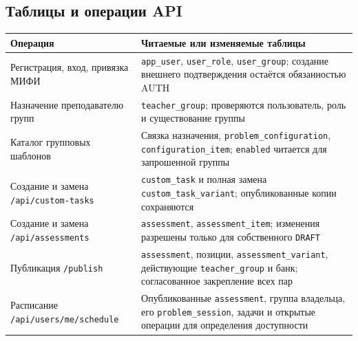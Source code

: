 \documentclass[12pt,a4paper]{article}
\newcounter{none} %
\begin{document}
\subsection{Таблицы и операции API}\label{ux442ux430ux431ux43bux438ux446ux44b-ux438-ux43eux43fux435ux440ux430ux446ux438ux438-api}

\hypertarget{таблицы-и-операции-api}{}

{\def\LTcaptype{none} %
\begin{longtable}[]{@{}
  >{\raggedright\arraybackslash}p{}
  >{\raggedright\arraybackslash}p{}@{}}
\toprule\noalign{}
\begin{minipage}[b]{\linewidth}\raggedright
Операция
\end{minipage} & \begin{minipage}[b]{\linewidth}\raggedright
Читаемые или изменяемые таблицы
\end{minipage} \\
\midrule\noalign{}
\endhead
\bottomrule\noalign{}
\endlastfoot
Регистрация, вход, привязка МИФИ & \texttt{app\_user}, \texttt{user\_role}, \texttt{user\_group}; создание внешнего подтверждения остаётся обязанностью AUTH \\
Назначение преподавателю групп & \texttt{teacher\_\allowbreak{}group}; проверяются пользователь, роль и существование группы \\
Каталог групповых шаблонов & Связка назначения, \texttt{problem\_\allowbreak{}configuration}, \texttt{configuration\_\allowbreak{}item}; \texttt{enabled} читается для запрошенной группы \\
Создание и замена \texttt{/\allowbreak{}api/\allowbreak{}custom-\allowbreak{}tasks} & \texttt{custom\_\allowbreak{}task} и полная замена \texttt{custom\_\allowbreak{}task\_\allowbreak{}variant}; опубликованные копии сохраняются \\
Создание и замена \texttt{/\allowbreak{}api/\allowbreak{}assessments} & \texttt{assessment}, \texttt{assessment\_\allowbreak{}item}; изменения разрешены только для собственного \texttt{DRAFT} \\
Публикация \texttt{/publish} & \texttt{assessment}, позиции, \texttt{assessment\_\allowbreak{}variant}, действующие \texttt{teacher\_\allowbreak{}group} и банк; согласованное закрепление всех пар \\
Расписание \texttt{/\allowbreak{}api/\allowbreak{}users/\allowbreak{}me/\allowbreak{}schedule} & Опубликованные \texttt{assessment}, группа владельца, его \texttt{problem\_\allowbreak{}session}, задачи и открытые операции для определения доступности \\

\end{longtable}}
\end{document}
